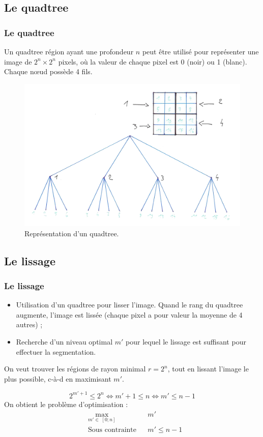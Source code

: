 \documentclass[handout]{beamer}
\begin{document}
		\subsection{Le quadtree}
		\begin{frame}
			\frametitle{Le quadtree}

			Un quadtree région ayant une profondeur $n$ peut être utilisé pour représenter une image de $2^n \times 2^n$ pixels, où la valeur de chaque pixel est 0 (noir) ou 1 (blanc). Chaque nœud possède 4 fils.
			\begin{figure}[H]
				\centering
				\includegraphics[scale=0.19]{images/quadtree-dessin.jpg}
				\caption{Représentation d'un quadtree.}
				\label{fig:quadtree2}
			\end{figure}
		\end{frame}

		\subsection{Le lissage}
		\begin{frame}
			\frametitle{Le lissage}
				\begin{itemize}
					\item Utilisation d'un quadtree pour lisser l'image. Quand le rang du quadtree augmente, l'image est lissée (chaque pixel a pour valeur la moyenne de 4 autres) ;
					\item Recherche d'un niveau optimal $m'$ pour lequel le lissage est suffisant pour effectuer la segmentation.
				\end{itemize}

				On veut trouver les régions de rayon minimal $r = 2^n$, tout en lissant l'image le plus possible, c-à-d en maximisant $m'$.

				\[2^{m' + 1} \leq 2^n \Leftrightarrow m'+1 \leq n \Leftrightarrow m' \leq n - 1\]
				On obtient le problème d'optimisation :
				\begin{equation*}
				\begin{aligned}
					& \underset{m' \in\; [0; n]}{\text{max}}
					& & m' \\
					& \text{Sous contrainte}
					& & m' \leq n - 1
					\end{aligned}
				\end{equation*}
		\end{frame}
\end{document}
